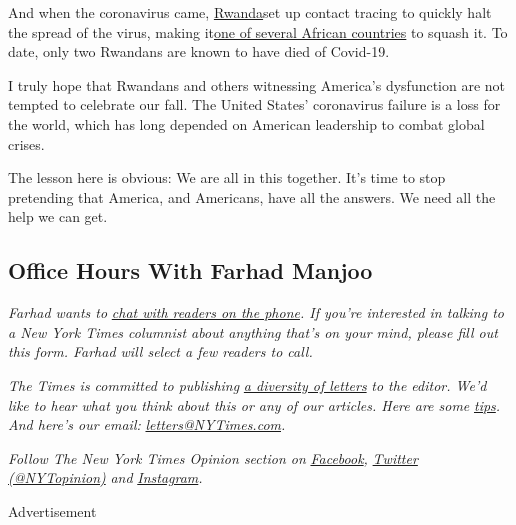 And when the coronavirus came,
\href{https://www.newyorker.com/news/news-desk/what-african-nations-are-teaching-the-west-about-fighting-the-coronavirus}{Rwanda}set
up contact tracing to quickly halt the spread of the virus, making
it\href{https://www.newyorker.com/news/news-desk/what-african-nations-are-teaching-the-west-about-fighting-the-coronavirus}{one
of several African countries} to squash it. To date, only two Rwandans
are known to have died of Covid-19.

I truly hope that Rwandans and others witnessing America's dysfunction
are not tempted to celebrate our fall. The United States' coronavirus
failure is a loss for the world, which has long depended on American
leadership to combat global crises.

The lesson here is obvious: We are all in this together. It's time to
stop pretending that America, and Americans, have all the answers. We
need all the help we can get.

\hypertarget{office-hours-with-farhad-manjoo}{%
\subsection{Office Hours With Farhad
Manjoo}\label{office-hours-with-farhad-manjoo}}

\emph{Farhad wants to}
\href{https://www.nytimes3xbfgragh.onion/2019/05/16/opinion/farhad-office-hours.html?module=inline}{\emph{chat
with readers on the phone}}\emph{. If you're interested in talking to a
New York Times columnist about anything that's on your mind, please fill
out this form. Farhad will select a few readers to call.}

\emph{The Times is committed to publishing}
\href{https://www.nytimes3xbfgragh.onion/2019/01/31/opinion/letters/letters-to-editor-new-york-times-women.html}{\emph{a
diversity of letters}} \emph{to the editor. We'd like to hear what you
think about this or any of our articles. Here are some}
\href{https://help.nytimes3xbfgragh.onion/hc/en-us/articles/115014925288-How-to-submit-a-letter-to-the-editor}{\emph{tips}}\emph{.
And here's our email:}
\href{mailto:letters@NYTimes.com}{\emph{letters@NYTimes.com}}\emph{.}

\emph{Follow The New York Times Opinion section on}
\href{https://www.facebookcorewwwi.onion/nytopinion}{\emph{Facebook}}\emph{,}
\href{http://twitter.com/NYTOpinion}{\emph{Twitter (@NYTopinion)}}
\emph{and}
\href{https://www.instagram.com/nytopinion/}{\emph{Instagram}}\emph{.}

Advertisement

